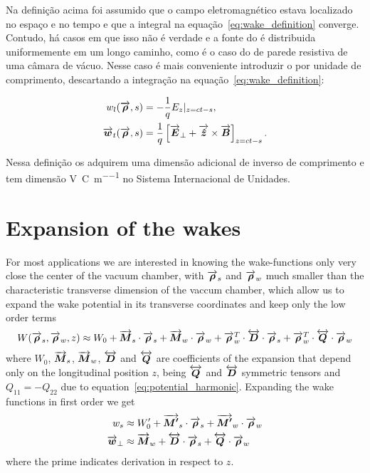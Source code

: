 \documentclass[
	12pt,				%
	openright,			%
	oneside,			%
	a4paper,		%
	chapter=TITLE,		%
	section=TITLE,		%
    brazil,				%
	english,			%
	sumario=tradicional,
	]{abntex2}
\begin{document}
  	Na definição acima foi assumido que o campo eletromagnético estava localizado no espaço e no tempo e que a integral na equação~\ref{eq:wake_definition} converge. Contudo, há casos em que isso não é verdade e a fonte do  é distribuida uniformemente em um longo caminho, como é o caso do  de parede resistiva de uma câmara de vácuo. Nesse caso é mais conveniente introduzir o  por unidade de comprimento, descartando a integração na equação~\ref{eq:wake_definition}:

  	\begin{equation}\begin{aligned}
  	    w_l(\overrightarrow{\boldsymbol{\rho}},s) &= -\frac1q E_z|_{z=ct-s}, \\
  	    \overrightarrow{\boldsymbol{w}}_t(\overrightarrow{\boldsymbol{\rho}},s) &= \frac1q\left[\overrightarrow{\boldsymbol{E}}_\perp + \overrightarrow{\boldsymbol{\hat{z}}}\times \overrightarrow{\boldsymbol{B}}\right]_{z=ct-s}.
  	\end{aligned}\end{equation}

  	Nessa definição os  adquirem uma dimensão adicional de inverso de comprimento e tem dimensão \si{\volt\per\coulomb\per\meter} no Sistema Internacional de Unidades.


  \section{Expansion of the wakes}

  For most applications we are interested in knowing the wake-functions only very close the center of the vacuum chamber, with $\overrightarrow{\boldsymbol{\rho}}_s$ and $\overrightarrow{\boldsymbol{\rho}}_w$ much smaller than the characteristic transverse dimension of the vaccum chamber, which allow us to expand the wake potential in its transverse coordinates and keep only the low order terms
  \begin{align}\label{eq:wake_potential_expansion}
      W(\overrightarrow{\boldsymbol{\rho}}_s, \overrightarrow{\boldsymbol{\rho}}_w, z) \approx W_0 +
	  \overrightarrow{\boldsymbol{M}}_s\cdot\overrightarrow{\boldsymbol{\rho}}_s + \overrightarrow{\boldsymbol{M}}_w\cdot\overrightarrow{\boldsymbol{\rho}}_w +
	  \overrightarrow{\boldsymbol{\rho}}_w^T\cdot\overleftrightarrow{\boldsymbol{D}}\cdot\overrightarrow{\boldsymbol{\rho}}_s +
	  \overrightarrow{\boldsymbol{\rho}}_w^T\cdot\overleftrightarrow{\boldsymbol{Q}}\cdot\overrightarrow{\boldsymbol{\rho}}_w
  \end{align}
  where $W_0$, $\overrightarrow{\boldsymbol{M}}_s$, $\overrightarrow{\boldsymbol{M}}_w$, $\overleftrightarrow{\boldsymbol{D}}$ and $\overleftrightarrow{\boldsymbol{Q}}$ are coefficients of the expansion that depend only on the longitudinal position $z$, being $\overleftrightarrow{\boldsymbol{Q}}$ and $\overleftrightarrow{\boldsymbol{D}}$ symmetric tensors and $Q_{11}=-Q_{22}$ due to equation~\eqref{eq:potential_harmonic}. Expanding the wake functions in first order we get
  \begin{align}\label{eq:wake_functions_expansion}
      w_s &\approx W'_0 + \overrightarrow{\boldsymbol{M'}}_s\cdot\overrightarrow{\boldsymbol{\rho}}_s + \overrightarrow{\boldsymbol{M'}}_w\cdot\overrightarrow{\boldsymbol{\rho}}_w \\
	  \overrightarrow{\boldsymbol{w}}_\perp &\approx \overrightarrow{\boldsymbol{M}}_w + \overleftrightarrow{\boldsymbol{D}}\cdot\overrightarrow{\boldsymbol{\rho}}_s + \overleftrightarrow{\boldsymbol{Q}}\cdot\overrightarrow{\boldsymbol{\rho}}_w
  \end{align}
  where the prime indicates derivation in respect to $z$.
\end{document}
